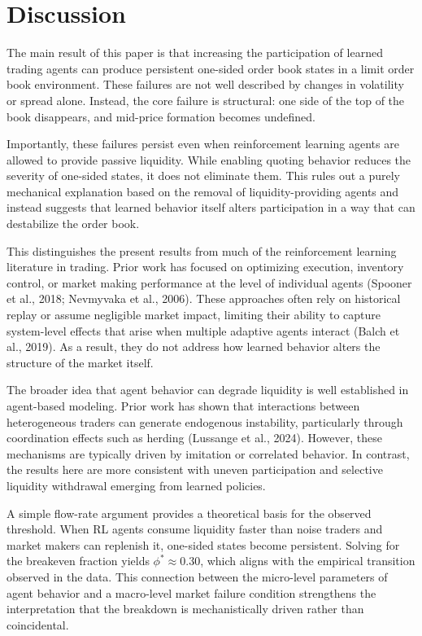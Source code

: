 \documentclass[sigconf]{acmart}
\begin{document}
\section{Discussion}

The main result of this paper is that increasing the participation of learned trading agents can produce persistent one-sided order book states in a limit order book environment. These failures are not well described by changes in volatility or spread alone. Instead, the core failure is structural: one side of the top of the book disappears, and mid-price formation becomes undefined.

Importantly, these failures persist even when reinforcement learning agents are allowed to provide passive liquidity. While enabling quoting behavior reduces the severity of one-sided states, it does not eliminate them. This rules out a purely mechanical explanation based on the removal of liquidity-providing agents and instead suggests that learned behavior itself alters participation in a way that can destabilize the order book.

This distinguishes the present results from much of the reinforcement learning literature in trading. Prior work has focused on optimizing execution, inventory control, or market making performance at the level of individual agents (Spooner et al., 2018; Nevmyvaka et al., 2006). These approaches often rely on historical replay or assume negligible market impact, limiting their ability to capture system-level effects that arise when multiple adaptive agents interact (Balch et al., 2019). As a result, they do not address how learned behavior alters the structure of the market itself.

The broader idea that agent behavior can degrade liquidity is well established in agent-based modeling. Prior work has shown that interactions between heterogeneous traders can generate endogenous instability, particularly through coordination effects such as herding (Lussange et al., 2024). However, these mechanisms are typically driven by imitation or correlated behavior. In contrast, the results here are more consistent with uneven participation and selective liquidity withdrawal emerging from learned policies.

A simple flow-rate argument provides a theoretical basis for the observed threshold. When RL agents consume liquidity faster than noise traders and market makers can replenish it, one-sided states become persistent. Solving for the breakeven fraction yields $\phi^* \approx 0.30$, which aligns with the empirical transition observed in the data. This connection between the micro-level parameters of agent behavior and a macro-level market failure condition strengthens the interpretation that the breakdown is mechanistically driven rather than coincidental.
\end{document}
